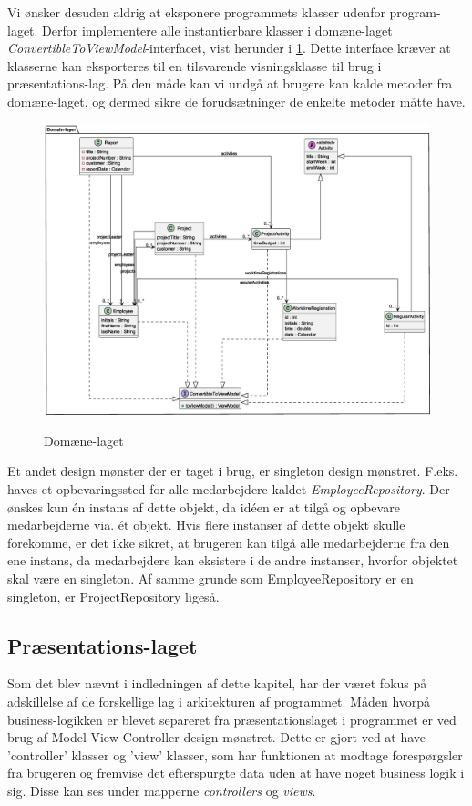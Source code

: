 Vi ønsker desuden aldrig at eksponere programmets klasser udenfor program-laget. Derfor implementere alle instantierbare klasser i domæne-laget \textit{ConvertibleToViewModel}-interfacet, vist herunder i \cref{fig:class_persistency_domain}. Dette interface kræver at klasserne kan eksporteres til en tilsvarende visningsklasse til brug i præsentations-lag. På den måde kan vi undgå at brugere kan kalde metoder fra domæne-laget, og dermed sikre de forudsætninger de enkelte metoder måtte have.
\begin{figure}[H]
    \centering
    \caption{Domæne-laget}
    \includegraphics[width = \textwidth]{ImplementationAndTest/Diagrams/ClassDiagrams/ClassDiagram_domain.eps}
    \label{fig:class_persistency_domain}
\end{figure}
Et andet design mønster der er taget i brug, er singleton design mønstret. F.eks. haves et opbevaringssted for alle medarbejdere kaldet \textit{EmployeeRepository}. Der ønskes kun én instans af dette objekt, da idéen er at tilgå og opbevare medarbejderne via. ét objekt. Hvis flere instanser af dette objekt skulle forekomme, er det ikke sikret, at brugeren kan tilgå alle medarbejderne fra den ene instans, da medarbejdere kan eksistere i de andre instanser, hvorfor objektet skal være en singleton. Af samme grunde som EmployeeRepository er en singleton, er ProjectRepository ligeså.
\subsection{Præsentations-laget}
Som det blev nævnt i indledningen af dette kapitel, har der været fokus på adskillelse af de forskellige lag i arkitekturen af programmet. Måden hvorpå business-logikken er blevet separeret fra præsentationslaget i programmet er ved brug af Model-View-Controller design mønstret. Dette er gjort ved at have ’controller’ klasser og ’view’ klasser, som har funktionen at modtage forespørgsler fra brugeren og fremvise det efterspurgte data uden at have noget business logik i sig. Disse kan ses under mapperne \textit{controllers} og \textit{views}.
